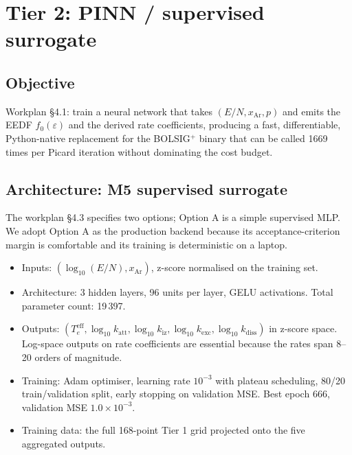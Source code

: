 \documentclass[11pt,a4paper]{article}
\newcommand{\kdiss}{k_{\mathrm{diss}}}
\newcommand{\kiz}{k_{\mathrm{iz}}}
\newcommand{\katt}{k_{\mathrm{att}}}
\begin{document}
\section{Tier 2: PINN / supervised surrogate}
\label{sec:tier2}

\subsection{Objective}
Workplan §4.1: train a neural network that takes
$(E/N, x_{\mathrm{Ar}}, p)$ and emits the EEDF $f_0(\varepsilon)$
and the derived rate coefficients, producing a fast,
differentiable, Python-native replacement for the BOLSIG$^+$
binary that can be called 1669 times per Picard iteration
without dominating the cost budget.

\subsection{Architecture: M5 supervised surrogate}
The workplan §4.3 specifies two options; Option A is a simple
supervised MLP. We adopt Option A as the production backend
because its acceptance-criterion margin is comfortable and its
training is deterministic on a laptop.

\begin{itemize}
  \item Inputs: $(\log_{10}(E/N), x_{\mathrm{Ar}})$, z-score
    normalised on the training set.
  \item Architecture: 3 hidden layers, 96 units per layer, GELU
    activations. Total parameter count: 19\,397.
  \item Outputs:
    $(T_e^{\mathrm{eff}}, \log_{10} \katt, \log_{10} \kiz,
    \log_{10} k_{\mathrm{exc}}, \log_{10} \kdiss)$ in z-score
    space. Log-space outputs on rate coefficients are essential
    because the rates span 8--20 orders of magnitude.
  \item Training: Adam optimiser, learning rate $10^{-3}$ with
    plateau scheduling, 80/20 train/validation split, early
    stopping on validation MSE. Best epoch 666, validation MSE
    $1.0 \times 10^{-3}$.
  \item Training data: the full 168-point Tier 1 grid projected
    onto the five aggregated outputs.
\end{itemize}
\end{document}
